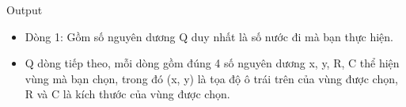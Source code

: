Output  
\begin{itemize}
	\item     Dòng 1: Gồm số nguyên dương Q duy nhất là số nước đi mà bạn thực hiện.   
	\item     Q dòng tiếp theo, mỗi dòng gồm đúng 4 số nguyên dương x, y, R, C thể hiện vùng mà bạn chọn, trong đó (x, y) là tọa độ ô trái trên của vùng được chọn, R và C là kích thước của vùng được chọn.   
\end{itemize}